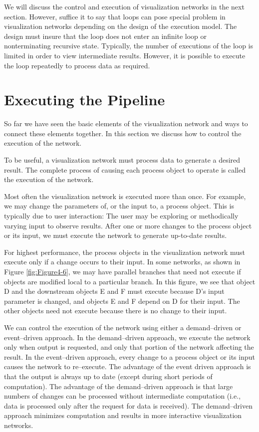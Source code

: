 We will discuss the control and execution of visualization networks in the next section. However, suffice it to say that loops can pose special problem in visualization networks depending on the design of the execution model. The design must insure that the loop does not enter an infinite loop or nonterminating recursive state. Typically, the number of executions of the loop is limited in order to view intermediate results. However, it is possible to execute the loop repeatedly to process data as required.

\section{Executing the Pipeline}
\label{sec:executing_pipeline}

So far we have seen the basic elements of the visualization network and ways to connect these elements together. In this section we discuss how to control the execution of the network.

To be useful, a visualization network must process data to generate a desired result. The complete process of causing each process object to operate is called the execution of the network.

Most often the visualization network is executed more than once. For example, we may change the parameters of, or the input to, a process object. This is typically due to user interaction: The user may be exploring or methodically varying input to observe results. After one or more changes to the process object or its input, we must execute the network to generate up-to-date results.

For highest performance, the process objects in the visualization network must execute only if a change occurs to their input. In some networks, as shown in Figure \ref{fig:Figure4-6}, we may have parallel branches that need not execute if objects are modified local to a particular branch. In this figure, we see that object D and the downstream objects E and F must execute because D's input parameter is changed, and objects E and F depend on D for their input. The other objects need not execute because there is no change to their input.

We can control the execution of the network using either a demand--driven or event--driven approach. In the demand--driven approach, we execute the network only when output is requested, and only that portion of the network affecting the result. In the event--driven approach, every change to a process object or its input causes the network to re--execute. The advantage of the event driven approach is that the output is always up to date (except during short periods of computation). The advantage of the demand--driven approach is that large numbers of changes can be processed without intermediate computation (i.e., data is processed only after the request for data is received). The demand--driven approach minimizes computation and results in more interactive visualization networks.

